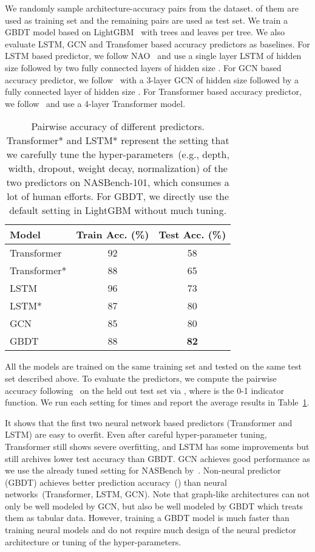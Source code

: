\documentclass{article}
\begin{document}
We randomly sample  architecture-accuracy pairs from the dataset.  of them are used as training set and the remaining  pairs are used as test set. We train a GBDT model based on LightGBM~\cite{lightgbm} with  trees and  leaves per tree. We also evaluate LSTM, GCN and Transfomer based accuracy predictors as baselines. For LSTM based predictor, we follow NAO~\cite{nao} and use a single layer LSTM of hidden size  followed by two fully connected layers of hidden size . For GCN based accuracy predictor, we follow~\cite{neuralpredictor} with a 3-layer GCN of hidden size  followed by a fully connected layer of hidden size . For Transformer based accuracy predictor, we follow~\cite{transformer} and use a 4-layer Transformer model.
\begin{table}
\centering
\caption{Pairwise accuracy of different predictors. Transformer* and LSTM* represent the setting that we carefully tune the hyper-parameters~(e.g., depth, width, dropout, weight decay, normalization) of the two predictors on NASBench-101, which consumes a lot of human efforts. For GBDT, we directly use the default setting in LightGBM without much tuning.}
\label{tbl:nasbench:acc}
\begin{tabular}{lcc}
\toprule
Model  & Train Acc. (\%) & Test Acc. (\%)\\
\midrule
Transformer & 92 & 58\\
Transformer* & 88 & 65\\
LSTM & 96 & 73 \\
LSTM* & 87 & 80\\
GCN & 85 & 80\\
\midrule
GBDT & 88 & \textbf{82}\\
\bottomrule
\end{tabular}
\end{table}

All the models are trained on the same training set and tested on the same test set described above. To evaluate the predictors, we compute the pairwise accuracy following~\cite{nao} on the held out test set via , where  is the 0-1 indicator function. We run each setting for  times and report the average results in Table~\ref{tbl:nasbench:acc}. 

It shows that the first two neural network based predictors (Transformer and LSTM) are easy to overfit. Even after careful hyper-parameter tuning, Transformer still shows severe overfitting, and LSTM has some improvements but still archives lower test accuracy than GBDT. GCN achieves good performance as we use the already tuned setting for NASBench by~\cite{neuralpredictor}. Non-neural predictor (GBDT) achieves better prediction accuracy~() than neural networks~(Transformer, LSTM, GCN). Note that graph-like architectures can not only be well modeled by GCN, but also be well modeled by GBDT which treats them as tabular data. However, training a GBDT model is much faster than training neural models and do not require much design of the neural predictor architecture or tuning of the hyper-parameters.
\end{document}
